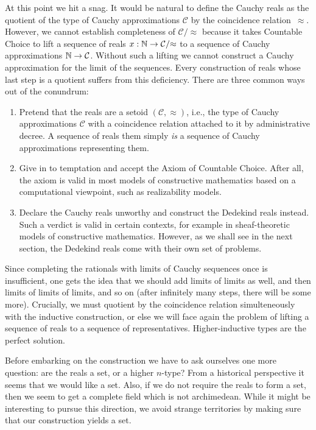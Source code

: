 At this point we hit a snag. It would be natural to define the Cauchy reals as the
quotient of the type of Cauchy approximations $\mathcal{C}$ by the coincidence
relation~$\approx$. However, we cannot establish completeness of $\mathcal{C}/{\approx}$
because it takes Countable Choice to lift a sequence of reals $x : \mathbb{N} \to
\mathcal{C}/{\approx}$ to a sequence of Cauchy approximations $\mathbb{N} \to \mathcal{C}$.
Without such a lifting we cannot construct a Cauchy approximation for the limit of the
sequences. Every construction of reals whose last step is a quotient suffers from this
deficiency. There are three common ways out of the conundrum:
%
\begin{enumerate}
\item Pretend that the reals are a setoid $(\mathcal{C}, {\approx})$, i.e., the type of
  Cauchy approximations $\mathcal{C}$ with a coincidence relation attached to it by
  administrative decree. A sequence of reals them simply \emph{is} a sequence of Cauchy
  approximations representing them.
\item Give in to temptation and accept the Axiom of Countable Choice. After all, the axiom
  is valid in most models of constructive mathematics based on a computational viewpoint,
  such as realizability models.
\item Declare the Cauchy reals unworthy and construct the Dedekind reals instead. Such a
  verdict is valid in certain contexts, for example in sheaf-theoretic models of
  constructive mathematics. However, as we shall see in the next section, the Dedekind
  reals come with their own set of problems.
\end{enumerate}
%
Since completing the rationals with limits of Cauchy sequences once is insufficient, one
gets the idea that we should add limits of limits as well, and then limits of limits of
limits, and so on (after infinitely many steps, there will be some more). Crucially, we
must quotient by the coincidence relation simulteneously with the inductive construction,
or else we will face again the problem of lifting a sequence of reals to a sequence of
representatives. Higher-inductive types are the perfect solution.

Before embarking on the construction we have to ask ourselves one more question: are the
reals a set, or a higher $n$-type? From a historical perspective it seems that we would
like a set. Also, if we do not require the reals to form a set, then we seem to get a
complete field which is not archimedean. While it might be interesting to pursue this
direction, we avoid strange territories by making sure that our construction yields a set.


